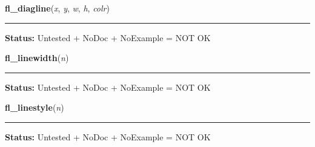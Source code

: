     \label{xformslib:library:fl_diagline}

    \vspace{0.5ex}

\hspace{.8\funcindent}\begin{boxedminipage}{\funcwidth}

    \raggedright \textbf{fl\_diagline}(\textit{x}, \textit{y}, \textit{w}, \textit{h}, \textit{colr})

    \vspace{-1.5ex}

    \rule{\textwidth}{0.5\fboxrule}
\setlength{\parskip}{2ex}
\setlength{\parskip}{1ex}
\textbf{Status:} Untested + NoDoc + NoExample = NOT OK



    \end{boxedminipage}

    \label{xformslib:library:fl_linewidth}

    \vspace{0.5ex}

\hspace{.8\funcindent}\begin{boxedminipage}{\funcwidth}

    \raggedright \textbf{fl\_linewidth}(\textit{n})

    \vspace{-1.5ex}

    \rule{\textwidth}{0.5\fboxrule}
\setlength{\parskip}{2ex}
\setlength{\parskip}{1ex}
\textbf{Status:} Untested + NoDoc + NoExample = NOT OK



    \end{boxedminipage}

    \label{xformslib:library:fl_linestyle}

    \vspace{0.5ex}

\hspace{.8\funcindent}\begin{boxedminipage}{\funcwidth}

    \raggedright \textbf{fl\_linestyle}(\textit{n})

    \vspace{-1.5ex}

    \rule{\textwidth}{0.5\fboxrule}
\setlength{\parskip}{2ex}
\setlength{\parskip}{1ex}
\textbf{Status:} Untested + NoDoc + NoExample = NOT OK



    \end{boxedminipage}

